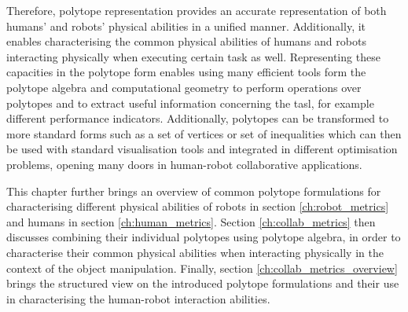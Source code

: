 Therefore, polytope representation provides an accurate representation of both humans' and robots' physical abilities in a unified manner. Additionally, it enables characterising the common physical abilities of humans and robots interacting physically when executing certain task as well. Representing these capacities in the polytope form enables using many efficient tools form the polytope algebra and computational geometry to perform operations over polytopes and to extract useful information concerning the tasl, for example different performance indicators. Additionally, polytopes can be transformed to more standard forms such as a set of vertices or set of inequalities which can then be used with standard visualisation tools and integrated in different optimisation problems, opening many doors in human-robot collaborative applications.

This chapter further brings an overview of common polytope formulations for characterising different physical abilities of robots in section \ref{ch:robot_metrics} and humans in section \ref{ch:human_metrics}. Section \ref{ch:collab_metrics} then discusses combining their individual polytopes using polytope algebra, in order to characterise their common physical abilities when interacting physically in the context of the object manipulation. Finally, section \ref{ch:collab_metrics_overview} brings the structured view on the introduced polytope formulations and their use in characterising the human-robot interaction abilities.


